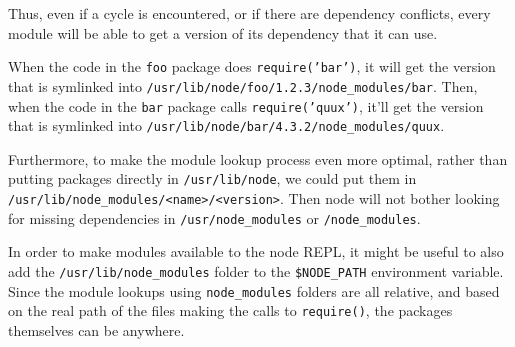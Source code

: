 Thus, even if a cycle is encountered, or if there are dependency
conflicts, every module will be able to get a version of its dependency
that it can use.

When the code in the \texttt{foo} package does \texttt{require('bar')},
it will get the version that is symlinked into
\texttt{/usr/lib/node/foo/1.2.3/node\_modules/bar}. Then, when the code
in the \texttt{bar} package calls \texttt{require('quux')}, it'll get
the version that is symlinked into
\texttt{/usr/lib/node/bar/4.3.2/node\_modules/quux}.

Furthermore, to make the module lookup process even more optimal, rather
than putting packages directly in \texttt{/usr/lib/node}, we could put
them in
\texttt{/usr/lib/node\_modules/\textless{}name\textgreater{}/\textless{}version\textgreater{}}.
Then node will not bother looking for missing dependencies in
\texttt{/usr/node\_modules} or \texttt{/node\_modules}.

In order to make modules available to the node REPL, it might be useful
to also add the \texttt{/usr/lib/node\_modules} folder to the
\texttt{\$NODE\_PATH} environment variable. Since the module lookups
using \texttt{node\_modules} folders are all relative, and based on the
real path of the files making the calls to \texttt{require()}, the
packages themselves can be anywhere.
